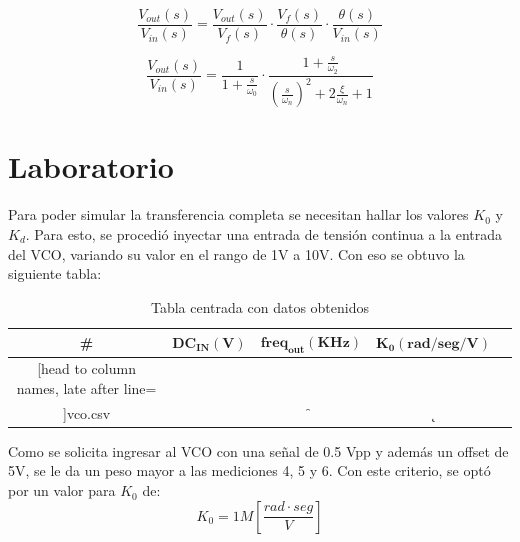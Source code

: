 \documentclass{article}
\begin{document}
\begin{equation} \label{voutvin_eqn}
\frac{V_{out}(s)}{V_{in}(s)} = \frac{V_{out}(s)}{V_f(s)} \cdot \frac{V_f(s)}{\theta(s)}\cdot \frac{\theta(s)}{V_{in}(s)}
\end{equation}

\begin{equation} \label{voutvin_eqn_posta}
\frac{V_{out}(s)}{V_{in}(s)} = \frac{1}{ 1 + \frac{s}{\omega_0}} 
\cdot \frac{ 1 + \frac{s}{\omega_2} }
{ \left(\frac{s}{\omega_n}\right)^2 + 2\frac{\xi}{\omega_n}  + 1} 
\end{equation}

\newpage

\section*{Laboratorio}
Para poder simular la transferencia completa se necesitan hallar los valores $K_0$ y $K_d$.
Para esto, se procedió inyectar una entrada de tensión continua a la entrada del VCO, variando su valor en el rango de 1V a 10V. Con eso se obtuvo la siguiente tabla:
\begin{table}[H]
	\centering
	\label{table7}
	\begin{tabular}{c c c c c}%
		\bfseries \# & $\bm{DC_{IN}(V)}$ & $\bm{freq_{out}(KHz)}$ & $\bm{K_0(rad/seg/V)}$  \\ \hline
		\csvreader[head to column names, late after line=\\]{vco.csv}{}{\thecsvrow & \dc & \f & \k}
		\hline
	\end{tabular}
		\caption{Tabla centrada con datos obtenidos}
\end{table}

Como se solicita ingresar al VCO con una señal de 0.5 Vpp y además un offset de 5V, se le da un peso mayor a las mediciones 4, 5 y 6. Con este  criterio, se optó por un valor para $K_0$ de:
\[ K_0= 1M \left[\frac{rad \cdot seg}{V}\right] \]
\end{document}
